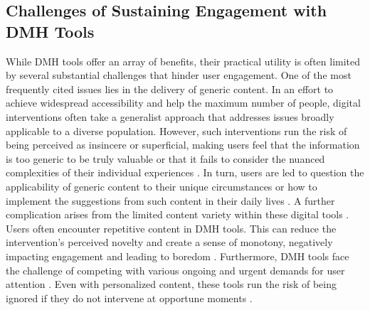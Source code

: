\subsection{Challenges of Sustaining Engagement with DMH Tools}


While DMH tools offer an array of benefits, their practical utility is often limited by several substantial challenges that hinder user engagement. One of the most frequently cited issues lies in the delivery of generic content. In an effort to achieve widespread accessibility and help the maximum number of people, digital interventions often take a generalist approach \cite{rennick2016health} that addresses issues broadly applicable to a diverse population. However, such interventions run the risk of being perceived as insincere or superficial, making users feel that the information is too generic to be truly valuable or that it fails to consider the nuanced complexities of their individual experiences \cite{bhattacharjee2023investigating, slovak2023designing}. 
In turn, users are led to question the applicability of generic content to their unique circumstances or how to implement the suggestions from such content in their daily lives \cite{lederman2014moderated, bhattacharjee2022design}.
A further complication arises from the limited content variety within these digital tools \cite{bhattacharjee2022design}. Users often encounter repetitive content in DMH tools. This can reduce the intervention's perceived novelty and create a sense of monotony, negatively impacting engagement and leading to boredom \cite{brown2014mobile}. %
Furthermore, DMH tools face the challenge of competing with various ongoing and urgent demands for user attention \cite{muench2017more}. Even with personalized content, these tools run the risk of being ignored if they do not intervene at opportune moments \cite{bhattacharjee2022design}. 


